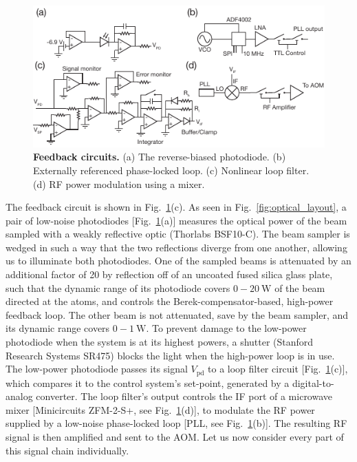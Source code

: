 \documentclass[twocolumn,aps,pra,showpacs,preprintnumbers,bibnotes]{revtex4-1}
\newcommand\unit[2]{\ensuremath{#1~\mathrm{{#2}}}}
\begin{document}
\begin{figure}
  \begin{center}
    \includegraphics{Figure6.pdf}
    \caption{\textbf{Feedback circuits.} (a) The reverse-biased photodiode. (b) Externally referenced phase-locked loop. (c) Nonlinear loop filter. (d) RF power modulation using a mixer.}\label{fig:circuits}
  \end{center}
\end{figure}
The feedback circuit is shown in Fig.~\ref{fig:circuits}(c). As seen in Fig.~\ref{fig:optical_layout}, a pair of low-noise photodiodes [Fig.~\ref{fig:circuits}(a)] measures the optical power of the beam sampled with a weakly reflective optic (Thorlabs BSF10-C).
The beam sampler is wedged in such a way that the two reflections diverge from one another, allowing us to illuminate both photodiodes.
One of the sampled beams is attenuated by an additional factor of 20 by reflection off of an uncoated fused silica glass plate, such that the dynamic range of its photodiode covers \unit{0-20}{W} of the beam directed at the atoms, and controls the Berek-compensator-based, high-power feedback loop.
The other beam is not attenuated, save by the beam sampler, and its dynamic range covers \unit{0-1}{W}.
To prevent damage to the low-power photodiode when the system is at its highest powers, a shutter (Stanford Research Systems SR475) blocks the light when the high-power loop is in use.
The low-power photodiode passes its signal $V_{\mathrm{pd}}$ to a loop filter circuit [Fig.~\ref{fig:circuits}(c)], which compares it to the control system's set-point, generated by a digital-to-analog converter.
The loop filter's output controls the IF port of a microwave mixer [Minicircuits ZFM-2-S+, see Fig.~\ref{fig:circuits}(d)], to modulate the RF power supplied by a low-noise phase-locked loop [PLL, see Fig.~\ref{fig:circuits}(b)].
The resulting RF signal is then amplified and sent to the AOM.
Let us now consider every part of this signal chain individually.
\end{document}
